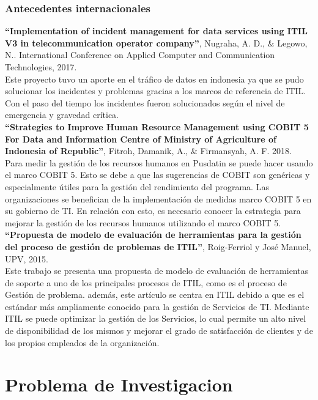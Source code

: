 \subsubsection{Antecedentes internacionales}
\textbf{``Implementation of incident management for data services using ITIL V3 in telecommunication operator company''}, Nugraha, A. D., \& Legowo, N.. International Conference on Applied Computer and Communication Technologies, 2017.\\[2pt]
Este proyecto tuvo un aporte en el tráfico de datos en indonesia ya que se pudo solucionar los incidentes y problemas gracias a los marcos de referencia de ITIL. Con el paso del tiempo los incidentes fueron solucionados según el nivel de emergencia y gravedad crítica.\\

\textbf{``Strategies to Improve Human Resource Management using COBIT 5 For Data and Information Centre of Ministry of Agriculture of Indonesia of Republic''}, Fitroh, Damanik, A., \& Firmansyah, A. F. 2018.\\[2pt]
Para medir la gestión de los recursos humanos en Pusdatin se puede hacer usando el marco COBIT 5. Esto se debe a que las sugerencias de COBIT son genéricas y especialmente útiles para la gestión del rendimiento del programa. Las organizaciones se benefician de la implementación de medidas marco COBIT 5 en su gobierno de TI. En relación con esto, es necesario conocer la estrategia para mejorar la gestión de los recursos humanos utilizando el marco COBIT 5.\\

\textbf{``Propuesta de modelo de evaluación de herramientas para la gestión del proceso de gestión de problemas de ITIL''}, Roig-Ferriol y José Manuel, UPV, 2015.\\[2pt]
Este trabajo se presenta una propuesta de modelo de evaluación de herramientas de soporte a uno de los principales procesos de ITIL, como es el proceso de Gestión de problema. además, este artículo se centra en ITIL debido a que es el estándar más ampliamente conocido para la gestión de Servicios de TI. Mediante ITIL se puede optimizar la gestión de los Servicios, lo cual permite un alto nivel de disponibilidad de los mismos y mejorar el grado de satisfacción de clientes y de los propios empleados de la organización.

\section{Problema de Investigacion}
